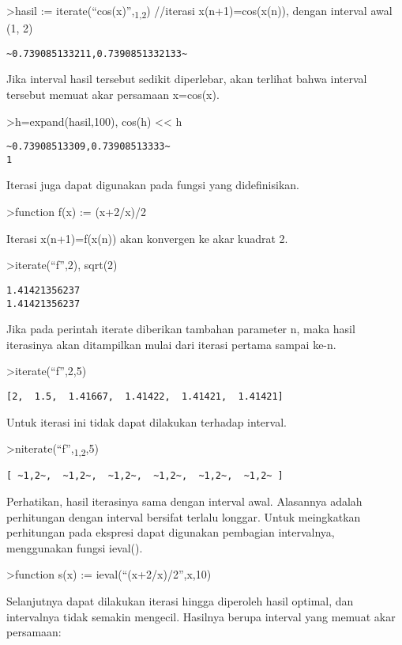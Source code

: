 \documentclass[
]{book}
\begin{document}
\textgreater hasil := iterate(``cos(x)'',\textsubscript{1,2}) //iterasi x(n+1)=cos(x(n)), dengan interval awal (1, 2)

\begin{verbatim}
~0.739085133211,0.7390851332133~
\end{verbatim}

Jika interval hasil tersebut sedikit diperlebar, akan terlihat bahwa interval tersebut memuat akar persamaan x=cos(x).

\textgreater h=expand(hasil,100), cos(h) \textless\textless{} h

\begin{verbatim}
~0.73908513309,0.73908513333~
1
\end{verbatim}

Iterasi juga dapat digunakan pada fungsi yang didefinisikan.

\textgreater function f(x) := (x+2/x)/2

Iterasi x(n+1)=f(x(n)) akan konvergen ke akar kuadrat 2.

\textgreater iterate(``f'',2), sqrt(2)

\begin{verbatim}
1.41421356237
1.41421356237
\end{verbatim}

Jika pada perintah iterate diberikan tambahan parameter n, maka hasil iterasinya akan ditampilkan mulai dari iterasi pertama sampai ke-n.

\textgreater iterate(``f'',2,5)

\begin{verbatim}
[2,  1.5,  1.41667,  1.41422,  1.41421,  1.41421]
\end{verbatim}

Untuk iterasi ini tidak dapat dilakukan terhadap interval.

\textgreater niterate(``f'',\textsubscript{1,2},5)

\begin{verbatim}
[ ~1,2~,  ~1,2~,  ~1,2~,  ~1,2~,  ~1,2~,  ~1,2~ ]
\end{verbatim}

Perhatikan, hasil iterasinya sama dengan interval awal. Alasannya adalah perhitungan dengan interval bersifat terlalu longgar. Untuk meingkatkan perhitungan pada ekspresi dapat digunakan pembagian intervalnya, menggunakan fungsi ieval().

\textgreater function s(x) := ieval(``(x+2/x)/2'',x,10)

Selanjutnya dapat dilakukan iterasi hingga diperoleh hasil optimal, dan intervalnya tidak semakin mengecil. Hasilnya berupa interval yang memuat akar persamaan:
\end{document}
